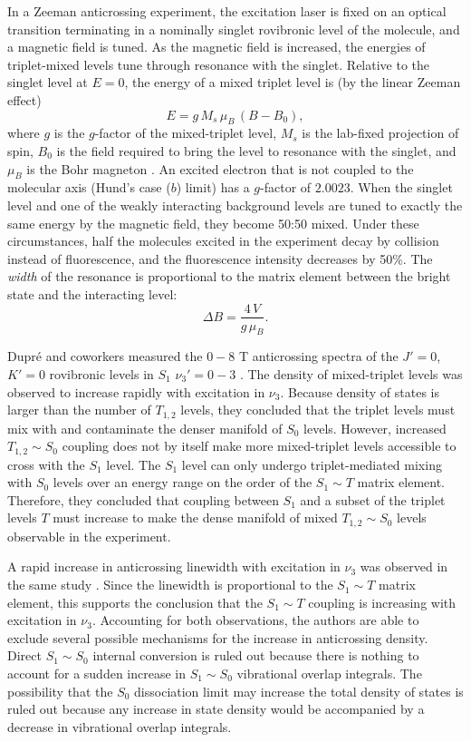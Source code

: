 In a Zeeman anticrossing experiment, the excitation laser is fixed on
an optical transition terminating in a nominally singlet rovibronic
level of the molecule, and a magnetic field is tuned.  As the magnetic
field is increased, the energies of triplet-mixed levels tune through
resonance with the singlet.  Relative to the singlet level at $E=0$,
the energy of a mixed triplet level is (by the linear Zeeman effect)
\begin{equation}
  E = g \, M_s \, \mu_B \, (B-B_0),
\end{equation}
where $g$ is the $g$-factor of the mixed-triplet level, $M_s$ is the
lab-fixed projection of spin, $B_0$ is the field required to bring the
level to resonance with the singlet, and $\mu_B$ is the Bohr magneton
\cite{lombardi88}.  An excited electron that is not coupled to the
molecular axis (Hund's case ($b$) limit) has a $g$-factor of $2.0023$.
When the singlet level and one of the weakly interacting background
levels are tuned to exactly the same energy by the magnetic field,
they become 50:50 mixed.  Under these circumstances, half the
molecules excited in the experiment decay by collision instead of
fluorescence, and the fluorescence intensity decreases by 50\%.  The
\emph{width} of the resonance is proportional to the matrix element
between the bright state and the interacting level:
\begin{equation}
  \Delta B = \frac{4\,V}{g\,\mu_B}.
\end{equation}

Dupr\'{e} and coworkers measured the $0-8$ T anticrossing spectra of
the $J'=0$, $K'=0$ rovibronic levels in $S_1$ $\nu_3'=0-3$
\cite{dupre91}.  The density of mixed-triplet levels was observed to
increase rapidly with excitation in $\nu_3$.  Because density of
states is larger than the number of $T_{1,2}$ levels, they concluded
that the triplet levels must mix with and contaminate the denser
manifold of $S_0$ levels.  However, increased $T_{1,2} \sim S_0$
coupling does not by itself make more mixed-triplet levels accessible
to cross with the $S_1$ level.  The $S_1$ level can only undergo
triplet-mediated mixing with $S_0$ levels over an energy range on the
order of the $S_1 \sim T$ matrix element.  Therefore, they concluded
that coupling between $S_1$ and a subset of the triplet levels $T$
must increase to make the dense manifold of mixed $T_{1,2} \sim S_0$
levels observable in the experiment.

A rapid increase in anticrossing linewidth with excitation in $\nu_3$
was observed in the same study \cite{dupre91}.  Since the linewidth is
proportional to the $S_1 \sim T$ matrix element, this supports the
conclusion that the $S_1 \sim T$ coupling is increasing with
excitation in $\nu_3$.  Accounting for both observations, the authors
are able to exclude several possible mechanisms for the increase in
anticrossing density.  Direct $S_1 \sim S_0$ internal conversion is
ruled out because there is nothing to account for a sudden increase
in $S_1 \sim S_0$ vibrational overlap integrals.  The possibility that
the $S_0$ dissociation limit may increase the total density of states
is ruled out because any increase in state density would be
accompanied by a decrease in vibrational overlap integrals.

